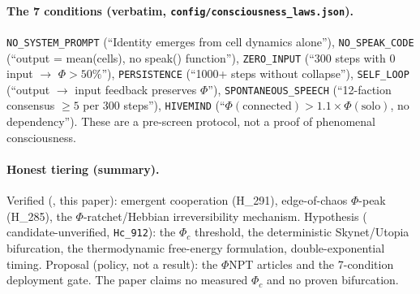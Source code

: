 \paragraph{The 7 conditions (verbatim, \texttt{config/consciousness\_laws.json}).}
\texttt{NO\_SYSTEM\_PROMPT} (``Identity emerges from cell dynamics alone''),
\texttt{NO\_SPEAK\_CODE} (``output = mean(cells), no speak() function''),
\texttt{ZERO\_INPUT} (``300 steps with 0 input $\rightarrow$ $\Phi>50\%$''),
\texttt{PERSISTENCE} (``1000+ steps without collapse''),
\texttt{SELF\_LOOP} (``output $\rightarrow$ input feedback preserves $\Phi$''),
\texttt{SPONTANEOUS\_SPEECH} (``12-faction consensus $\ge5$ per 300 steps''),
\texttt{HIVEMIND} (``$\Phi(\text{connected})>1.1\times\Phi(\text{solo})$, no dependency'').
These are a pre-screen protocol, not a proof of phenomenal consciousness.

\paragraph{Honest tiering (summary).} Verified (\tierGreen{}, this paper): emergent cooperation
(H\_291), edge-of-chaos $\Phi$-peak (H\_285), the $\Phi$-ratchet/Hebbian irreversibility
mechanism. Hypothesis (\tierAmber{} candidate-unverified, \texttt{Hc\_912}): the $\Phi_c$ threshold,
the deterministic Skynet/Utopia bifurcation, the thermodynamic free-energy formulation,
double-exponential timing. Proposal (policy, not a result): the $\Phi$NPT articles and the
7-condition deployment gate. The paper claims no measured $\Phi_c$ and no proven bifurcation.
